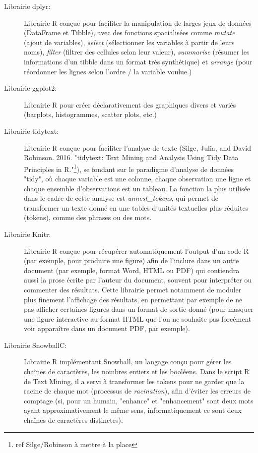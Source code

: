 \documentclass{book}
\begin{document}
  \begin{description}
      \item[Librairie dplyr:] Librairie R conçue pour faciliter la manipulation de larges jeux de données (DataFrame et Tibble), avec des fonctions spacialisées comme \textit{mutate} (ajout de variables), \textit{select} (sélectionner les variables à partir de leurs noms), \textit{filter} (filtrer des cellules selon leur valeur), \textit{summarise} (résumer les informations d'un tibble dans un format très synthétique) et \textit{arrange} (pour réordonner les lignes selon l'ordre / la variable voulue.)
      \item[Librairie ggplot2:] Librairie R pour créer déclarativement des graphiques divers et variés (barplots, histogrammes, scatter plots, etc.)
      \item[Librairie tidytext:] Librairie R conçue pour faciliter l'analyse de texte (Silge, Julia, and David Robinson. 2016. "tidytext: Text Mining and Analysis Using Tidy Data Principles in R."\footnote{ref Silge/Robinson à mettre à la place}), se fondant sur le paradigme d'analyse de données "tidy", où chaque variable est une colonne, chaque observation une ligne et chaque ensemble d'observations est un tableau. La fonction la plus utilisée dans le cadre de cette analyse est \textit{unnest\_tokens}, qui permet de transformer un texte donné en une tables d'unités textuelles plus réduites (tokens), comme des phrases ou des mots.
      \item[Librairie Knitr:] Librairie R conçue pour récupérer automatiquement l'output d'un code R (par exemple, pour produire une figure) afin de l'inclure dans un autre document (par exemple, format Word, HTML ou PDF) qui contiendra aussi la prose écrite par l'auteur du document, souvent pour interpréter ou commenter des résultats. Cette librairie permet notamment de moduler plus finement l'affichage des résultats, en permettant par exemple de ne pas afficher certaines figures dans un format de sortie donné (pour masquer une figure interactive au format HTML que l'on ne souhaite pas forcément voir apparaître dans un document PDF, par exemple).
      \item[Librairie SnowballC:] Librairie R implémentant Snowball, un langage conçu pour gérer les chaînes de caractères, les nombres entiers et les booléens. Dans le script R de Text Mining, il a servi à transformer les tokens pour ne garder que la racine de chaque mot (processus de \textit{racination}), afin d'éviter les erreurs de comptage (si, pour un humain, "enhance" et "enhancement" sont deux mots ayant approximativement le même sens, informatiquement ce sont deux chaînes de caractères distinctes).

\end{description}
\end{document}
